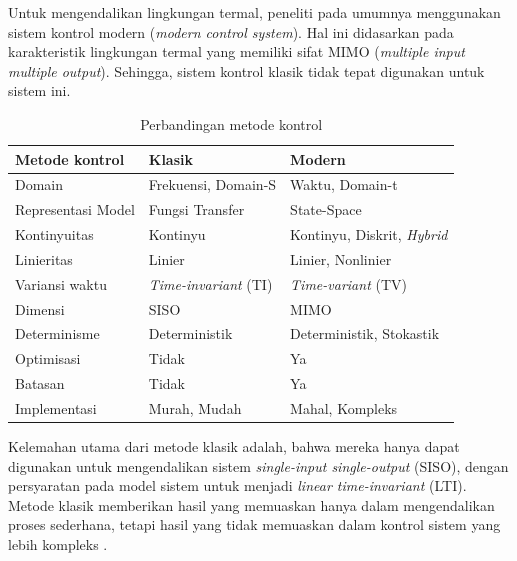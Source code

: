 Untuk mengendalikan lingkungan termal, peneliti pada umumnya menggunakan sistem kontrol modern (\textit{modern control system}). Hal ini didasarkan pada karakteristik lingkungan termal yang memiliki sifat MIMO (\textit{multiple input multiple output}). Sehingga, sistem kontrol klasik tidak tepat digunakan untuk sistem ini.
\begin{table}[!h]
	\caption{Perbandingan metode kontrol}
	\label{tbl:3:whyann}
	\centering
	\begin{tabular}{|p{4cm}|p{4cm}|p{4.5cm}|}
		\hline
		\textbf{Metode kontrol} & \textbf{Klasik} & \textbf{Modern} \\ 
		\hline
		Domain & Frekuensi, Domain-S & Waktu, Domain-t \\ 
		\hline
		Representasi Model & Fungsi Transfer & State-Space \\ 
		\hline
		Kontinyuitas & Kontinyu & Kontinyu, Diskrit, \textit{Hybrid} \\ 
		\hline
		Linieritas & Linier & Linier, Nonlinier \\ 
		\hline
		Variansi waktu & \textit{Time-invariant} (TI) & \textit{Time-variant} (TV) \\ 
		\hline
		Dimensi & SISO & MIMO \\ 
		\hline
		Determinisme & Deterministik & Deterministik, Stokastik \\ 
		\hline
		Optimisasi & Tidak & Ya \\ 
		\hline
		Batasan & Tidak & Ya \\ 
		\hline
		Implementasi & Murah, Mudah & Mahal, Kompleks \\ 
		\hline
	\end{tabular}
\end{table}

Kelemahan utama dari metode klasik adalah, bahwa mereka hanya dapat digunakan untuk mengendalikan sistem \textit{single-input single-output} (SISO), dengan persyaratan pada model sistem untuk menjadi \textit{linear time-invariant} (LTI). Metode klasik memberikan hasil yang memuaskan hanya dalam mengendalikan proses sederhana, tetapi hasil yang tidak memuaskan dalam kontrol sistem yang lebih kompleks \cite{MPCDissertation}. \\
